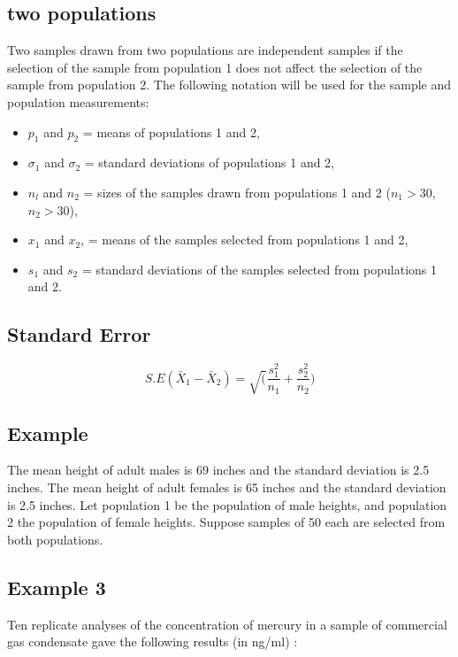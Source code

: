 \documentclass[14pt, a4paper]{article}
\theoremstyle{plain}
\theoremstyle{definition}
\theoremstyle{remark}
\begin{document}
\subsection{two populations}

Two samples drawn from two populations are independent samples if
the selection of the sample from population 1 does not affect the
selection of the sample from population 2. The following notation
will be used for the sample and population measurements:

\begin{itemize}
\item $p_1$ and $p_2$ = means of populations 1 and 2,

\item $\sigma_1$ and $\sigma_2$ = standard deviations of
populations 1 and 2,

\item $n_l$ and $n_2$ = sizes of the samples drawn from
populations 1 and 2 ($n_1 >30 $, $n_2 >30 $),

\item $x_1$ and $x_2$, = means of the samples selected from
populations 1 and 2,

\item $s_{1}$ and $s_{2}$ = standard deviations of the samples
selected from populations 1 and 2.

\end{itemize}
\newpage


\subsection{Standard Error}

\begin{equation}
S.E(\bar{X}_{1}-\bar{X}_{2}) =
\sqrt(\frac{s^2_{1}}{n_{1}}+\frac{s^2_{2}}{n_{2}})
\end{equation}

\subsection{Example}
The mean height of adult males is 69 inches and the standard
deviation is 2.5 inches. The mean height of adult females is 65
inches and the standard deviation is 2.5 inches. Let population 1
be the population of male heights, and population 2 the population
of female heights. Suppose samples of 50 each are selected from
both populations.



\subsection{Example 3} Ten replicate analyses of the concentration
of mercury in a sample of commercial gas condensate gave the
following results (in ng/ml) :
\end{document}
